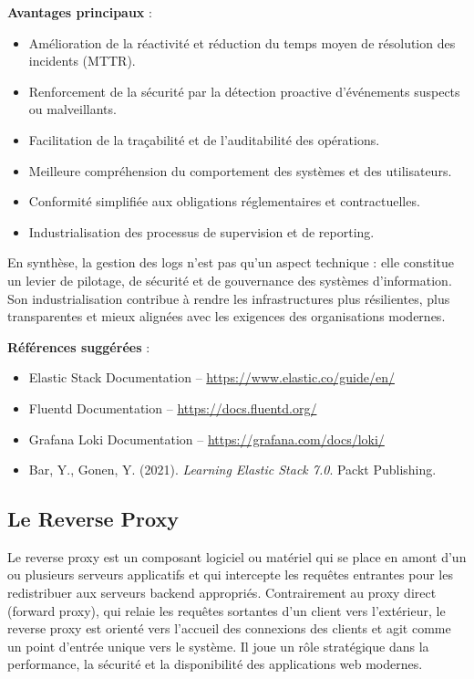 \textbf{Avantages principaux} :
\begin{itemize}
	\item Amélioration de la réactivité et réduction du temps moyen de résolution des incidents (MTTR).
	\item Renforcement de la sécurité par la détection proactive d’événements suspects ou malveillants.
	\item Facilitation de la traçabilité et de l’auditabilité des opérations.
	\item Meilleure compréhension du comportement des systèmes et des utilisateurs.
	\item Conformité simplifiée aux obligations réglementaires et contractuelles.
	\item Industrialisation des processus de supervision et de reporting.
\end{itemize}

En synthèse, la gestion des logs n’est pas qu’un aspect technique  : elle constitue un levier de pilotage, de sécurité et de gouvernance des systèmes d’information. Son industrialisation contribue à rendre les infrastructures plus résilientes, plus transparentes et mieux alignées avec les exigences des organisations modernes.

\textbf{Références suggérées} :
\begin{itemize}
	\item Elastic Stack Documentation – \url{https://www.elastic.co/guide/en/}
	\item Fluentd Documentation – \url{https://docs.fluentd.org/}
	\item Grafana Loki Documentation – \url{https://grafana.com/docs/loki/}
	\item Bar, Y., Gonen, Y. (2021). \textit{Learning Elastic Stack 7.0}. Packt Publishing.
\end{itemize}

\subsection{Le Reverse Proxy}

Le reverse proxy est un composant logiciel ou matériel qui se place en amont d’un ou plusieurs serveurs applicatifs et qui intercepte les requêtes entrantes pour les redistribuer aux serveurs backend appropriés. Contrairement au proxy direct (forward proxy), qui relaie les requêtes sortantes d’un client vers l’extérieur, le reverse proxy est orienté vers l’accueil des connexions des clients et agit comme un point d’entrée unique vers le système. Il joue un rôle stratégique dans la performance, la sécurité et la disponibilité des applications web modernes.


